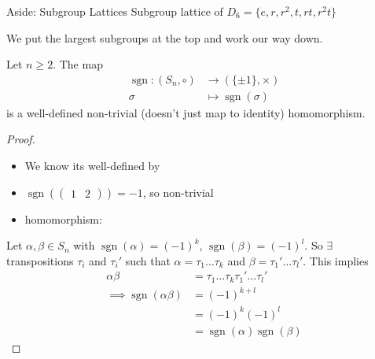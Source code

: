 \begin{aside}{Aside: Subgroup Lattices}
Subgroup lattice of $D_6 = \{ e, r, r^2, t, rt, r^2t \}$

\begin{center}
\end{center}

We put the largest subgroups at the top and work our way down.

\end{aside}

\begin{theorem}
\protect\hypertarget{thm:two}{}\label{thm:two}Let $n \geq 2$.
The map
\begin{align*}
    \operatorname{sgn} : (S_n, \circ) &\to \left( \{ \pm 1 \}, \times \right) \\
    \sigma &\mapsto \operatorname{sgn}(\sigma)
\end{align*}
is a well-defined non-trivial (doesn't just map to identity) homomorphism.
\end{theorem}

\begin{proof}
~

\begin{itemize}
\item
  We know its well-defined by 
\item
  $\operatorname{sgn}\left( \begin{pmatrix}1 & 2\end{pmatrix} \right) = -1$, so non-trivial
\item
  homomorphism:
\end{itemize}

Let $\alpha, \beta \in S_n$ with $\operatorname{sgn} (\alpha) = (-1)^k$, $\operatorname{sgn} (\beta) = (-1)^l$.
So $\exists$ transpositions $\tau_i$ and $\tau_i'$ such that $\alpha = \tau_1 \dots \tau_k$ and $\beta = \tau_1' \dots \tau_l'$.
This implies
\begin{align*}
    \alpha \beta &= \tau_1 \dots \tau_k \tau_1' \dots \tau_l' \\
    \implies \operatorname{sgn}(\alpha \beta) &= (-1)^{k + l} \\
    &= (-1)^k (-1)^l \\
    &= \operatorname{sgn}(\alpha) \operatorname{sgn}(\beta)
\end{align*}
\end{proof}

